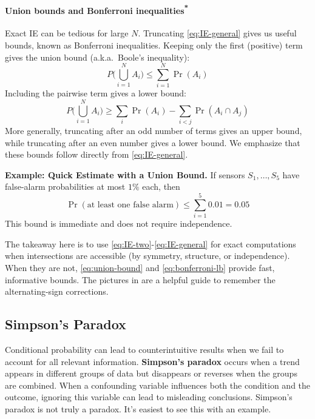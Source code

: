 \paragraph*{\texorpdfstring{Union bounds and Bonferroni inequalities\textsuperscript{*}}{Union bounds and Bonferroni inequalities}}
Exact IE can be tedious for large $N$. Truncating \autoref{eq:IE-general} gives us useful bounds, known as Bonferroni inequalities. Keeping only the first (positive) term gives the union bound (a.k.a.\ Boole's inequality):
\begin{equation}
    P\!\Big(\bigcup_{i=1}^N A_i\Big) \le \sum_{i=1}^N \Pr(A_i)
    \label{eq:union-bound}
\end{equation}
Including the pairwise term gives a lower bound:
\begin{equation}
    P\!\Big(\bigcup_{i=1}^N A_i\Big) \ge \sum_i \Pr(A_i) - \sum_{i<j} \Pr(A_i\cap A_j)
    \label{eq:bonferroni-lb}
\end{equation}
More generally, truncating after an odd number of terms gives an upper bound, while truncating after an even number gives a lower bound. We emphasize that these bounds follow directly from \autoref{eq:IE-general}.

\begin{exampleBox}
\textbf{Example: Quick Estimate with a Union Bound.}
If sensors $S_1,\dots,S_5$ have false-alarm probabilities at most $1\%$ each, then
\begin{equation}
    \Pr(\text{at least one false alarm}) \le \sum_{i=1}^5 0.01 = 0.05
\end{equation}
This bound is immediate and does not require independence.
\end{exampleBox}
The takeaway here is to use \autoref{eq:IE-two}-\autoref{eq:IE-general} for exact computations when intersections are accessible (by symmetry, structure, or independence). When they are not, \autoref{eq:union-bound} and \autoref{eq:bonferroni-lb} provide fast, informative bounds. The pictures in  are a helpful guide to remember the alternating-sign corrections.


\subsection{Simpson's Paradox}
Conditional probability can lead to counterintuitive results when we fail to account for all relevant information. \textbf{Simpson's paradox} occurs when a trend appears in different groups of data but disappears or reverses when the groups are combined. When a confounding variable influences both the condition and the outcome, ignoring this variable can lead to misleading conclusions. Simpson's paradox is not truly a paradox. It's easiest to see this with an example.

